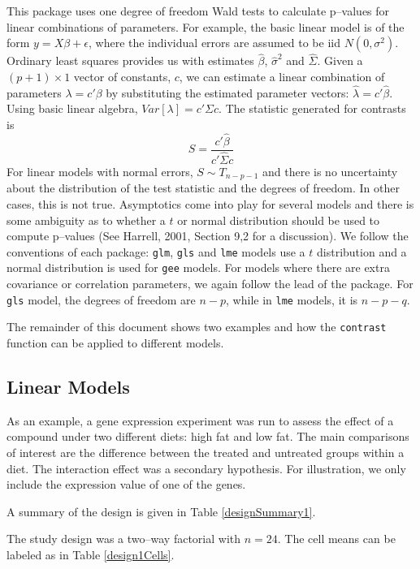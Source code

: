 \documentclass[12pt]{article}
\newcommand{\code}[1]{\mbox{\footnotesize\color{darkblue}\texttt{#1}}}
\begin{document}
This package uses one degree of freedom Wald tests to calculate p--values for linear combinations of parameters. For example, the basic linear model is of the form $y=X\beta+\epsilon$, where the individual errors are assumed to be iid $N(0, \sigma^2)$. Ordinary least squares provides us with estimates $\hat{\beta}$, $\hat{\sigma}^2$ and $\hat{\Sigma}$. Given a $(p+1)\times 1$ vector of constants, $c$, we can estimate a linear combination of parameters $\lambda = c'\beta$ by substituting the estimated parameter vectors: $\hat{\lambda} = c'\hat{\beta}$. Using basic linear algebra, $Var[\lambda] =  c'\Sigma c$. The statistic generated for contrasts is
\begin{equation}\label{E:Wald}
S = \frac{c'\hat{\beta}}{c'\hat{\Sigma} c} 
\end{equation}
For linear models with normal errors, $S\sim T_{n-p-1}$ and there is no uncertainty about the distribution of the test statistic and the degrees of freedom. In other cases, this is not true. Asymptotics come into play for several models and there is some ambiguity as to whether a $t$ or normal distribution should be used to compute p--values (See Harrell, 2001, Section 9,2 for a discussion). We follow the conventions of each package: \code{glm}, \code{gls} and \code{lme} models use a $t$ distribution and a normal distribution is used for \code{gee} models. For models where there are extra covariance or correlation parameters, we again follow the lead of the package. For \code{gls} model, the degrees of freedom are $n-p$, while in \code{lme} models, it is $n-p-q$.

The remainder of this document shows two examples and how the \code{contrast} function can be applied to different models.

\subsection{Linear Models}
 


As an example, a gene expression experiment was run to assess the effect of a compound under two different diets: high fat and low fat. The main comparisons of interest are the difference between the treated and untreated groups within a diet. The interaction effect was a secondary hypothesis. For illustration, we only include the expression value of one of the genes.

A summary of the design is given in Table \ref{designSummary1}.

 
%
The study design was a two--way factorial with $n=24$. The cell means can be labeled as in Table \ref{design1Cells}.
\end{document}
